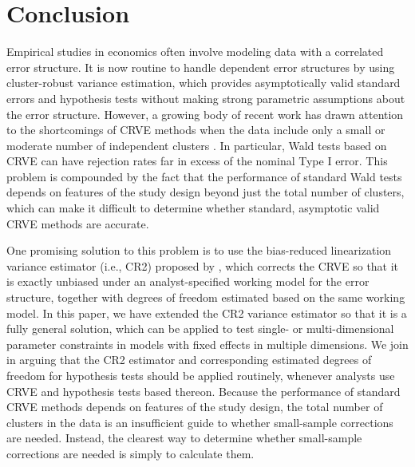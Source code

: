 \documentclass[12pt]{article}\usepackage[]{graphicx}\usepackage[]{color}
\begin{document}
\section{Conclusion}
\label{sec:conclusion}

Empirical studies in economics often involve modeling data with a correlated error structure. 
It is now routine to handle dependent error structures by using cluster-robust variance estimation, which provides asymptotically valid standard errors and hypothesis tests without making strong parametric assumptions about the error structure. 
However, a growing body of recent work has drawn attention to the shortcomings of CRVE methods when the data include only a small or moderate number of independent clusters \citep{Cameron2008bootstrap, Cameron2015practitioners, Imbens2015robust, Webb2013wild}. 
In particular, Wald tests based on CRVE can have rejection rates far in excess of the nominal Type I error. 
This problem is compounded by the fact that the performance of standard Wald tests depends on features of the study design beyond just the total number of clusters, which can make it difficult to determine whether standard, asymptotic valid CRVE methods are accurate. 

One promising solution to this problem is to use the bias-reduced linearization variance estimator (i.e., CR2) proposed by \citet{Bell2002bias}, which corrects the CRVE so that it is exactly unbiased under an analyst-specified working model for the error structure, together with degrees of freedom estimated based on the same working model.
In this paper, we have extended the CR2 variance estimator so that it is a fully general solution, which can be applied to test single- or multi-dimensional parameter constraints in models with fixed effects in multiple dimensions. 
We join \citet{Imbens2015robust} in arguing that the CR2 estimator and corresponding estimated degrees of freedom for hypothesis tests should be applied routinely, whenever analysts use CRVE and hypothesis tests based thereon. 
Because the performance of standard CRVE methods depends on features of the study design, the total number of clusters in the data is an insufficient guide to whether small-sample corrections are needed. 
Instead, the clearest way to determine whether small-sample corrections are needed is simply to calculate them.
\end{document}
